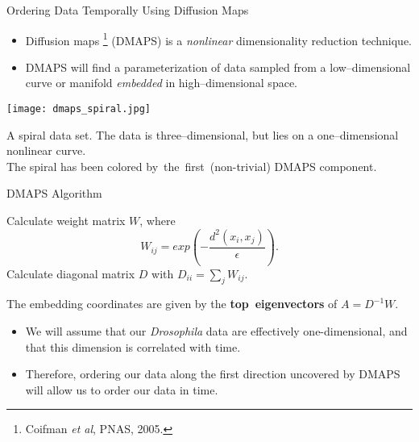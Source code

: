\begin{frame}{Ordering Data Temporally Using Diffusion Maps}

\begin{itemize}
\item Diffusion maps \footnote{ \tiny Coifman {\em et al}, PNAS, 2005.} (DMAPS) is a {\em nonlinear} dimensionality reduction technique.
\item DMAPS will find a parameterization of data sampled from a low--dimensional curve or manifold {\em embedded} in high--dimensional space.
\end{itemize}

	\begin{minipage}{0.45\textwidth}
	\centering
		\texttt{[image: dmaps\_spiral.jpg]}\\
		\centering
		{\scriptsize A spiral data set. The data is three--dimensional, but lies on a one--dimensional nonlinear curve. \\
		The spiral has been colored by~the~first~(non-trivial) DMAPS component. \par}
	\end{minipage}
	\hfill
	\begin{minipage}{0.5\textwidth}
		\begin{block}{DMAPS Algorithm}
		{\scriptsize 
		Calculate weight matrix $W$, where
		$$W_{ij} = exp\left( -\frac{d^2(x_i, x_j)}{\epsilon} \right).$$
		Calculate diagonal matrix $D$ with $D_{ii} = \sum_j W_{ij}.$
		
		The embedding coordinates are given by the {\bf top~eigenvectors} of $A=D^{-1}W$.
		\par}
	\end{block}
	\end{minipage}


{\small
\begin{itemize}
\item We will assume that our {\em Drosophila} data are effectively one-dimensional, and that this dimension is correlated with time. 
%
\item Therefore, ordering our data along the first direction uncovered by DMAPS will allow us to order our data in time. 
\end{itemize}
\par}

\end{frame}

